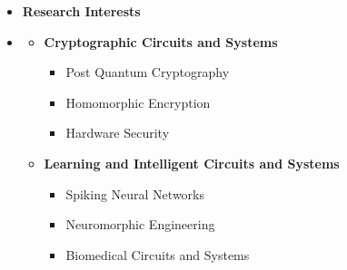 \begin {itemize} \item [] {\bf \Large  Research Interests  }  \vspace{-1.5em}
\item []  {\bf \hrulefill } \mdseries \normalsize 
    \begin {itemize}
        \item [$\bullet$] \bf {\mtf \normalsize  Cryptographic Circuits and Systems} \mdseries
            \begin {itemize}
                \item [-]  {  Post Quantum Cryptography} 
                \item [-]   {  Homomorphic Encryption} 
                \item [-]  { Hardware Security}
            \end {itemize} \vspace{0.3cm}
     \item [$\bullet$] \bf {\mtf \normalsize Learning and Intelligent Circuits and Systems} \mdseries
            \begin {itemize}
                \item [-]  {  Spiking Neural Networks} 
                \item [-]   {  Neuromorphic Engineering} 
                \item [-]  Biomedical Circuits and Systems
            \end {itemize} \vspace{0.3cm}
    \end {itemize}
\end {itemize}



























